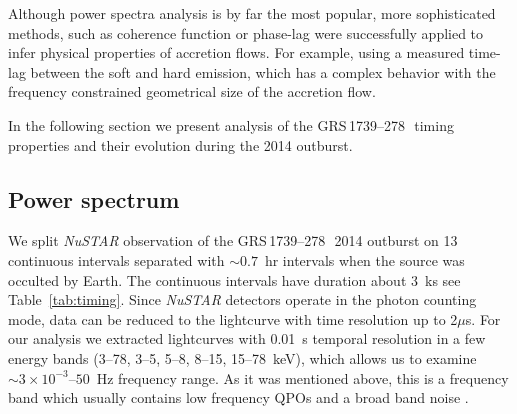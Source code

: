 \documentclass[a4paper,fleqn,usenatbib]{mnras}
\def\grs{{GRS\,1739--278\,}}
\begin{document}
Although power spectra analysis is by far the most popular, more sophisticated methods, such as coherence function or phase-lag were successfully applied to infer physical properties of accretion flows. 
For example, using a measured time-lag between the soft and hard emission, which has a complex behavior with the frequency \citet{1999ApJ...517..355N} constrained geometrical size of the accretion flow. 


In the following section we present analysis of the \grs\ timing properties and their evolution during the 2014 outburst.

\subsection{Power spectrum}

We split {\it NuSTAR} observation of the \grs\ 2014 outburst on 13 continuous intervals separated with $\sim0.7$~hr intervals when the source was occulted by Earth. 
The continuous intervals have duration about 3~ks see Table~\ref{tab:timing}.
Since {\it NuSTAR} detectors operate in the photon counting mode, data can be reduced to the lightcurve with time resolution up to 2$\mu$s.
For our analysis we extracted lightcurves with 0.01~s temporal resolution in a few energy bands (3--78, 3--5, 5--8, 8--15, 15--78~keV), which allows us to examine $\sim3\times10^{-3}$--$50$~Hz frequency range.
As it was mentioned above, this is a frequency band which usually contains low frequency QPOs and a broad band noise \citep{wijnands99}.
\end{document}
